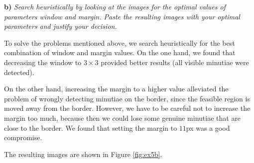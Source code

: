 \documentclass[11pt]{article}
\begin{document}
\textbf{b) }\emph{Search heuristically by looking at the images for the optimal values of parameters window and margin. Paste the resulting images with your optimal parameters and justify your decision.}

To solve the problems mentioned above, we search heuristically for the best combination of window and margin values. On the one hand, we found that decreasing the window to $3\times 3$ provided better results (all visible minutiae were detected).

On the other hand, increasing the margin to a higher value alleviated the problem of wrongly detecting minutiae on the border, since the feasible region is moved away from the border. However, we have to be careful not to increase the margin too much, because then we could lose some genuine minutiae that are close to the border. We found that setting the margin to $11$px was a good compromise.

The resulting images are shown in Figure \ref{fig:ex5b}.
\end{document}
